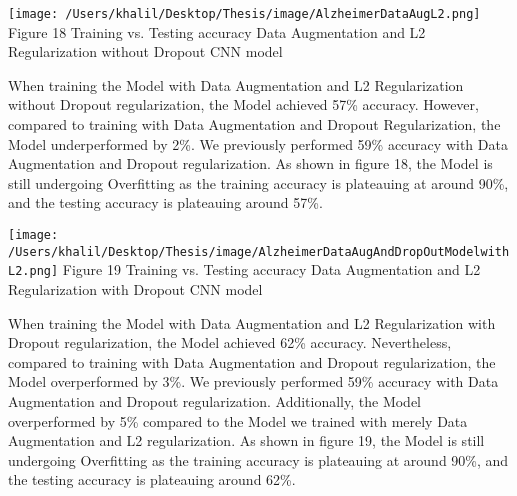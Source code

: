 \documentclass[oneside,12pt,article]{article}
\begin{document}
 \begin{center}
\texttt{[image: /Users/khalil/Desktop/Thesis/image/AlzheimerDataAugL2.png]} 
\newline
Figure 18 Training vs. Testing accuracy Data Augmentation and L2 Regularization without Dropout CNN model 
\end{center}
When training the Model with Data Augmentation and L2 Regularization without Dropout regularization, the Model achieved 57\% accuracy. However, compared to training with Data Augmentation and Dropout Regularization, the Model underperformed by 2\%. We previously performed 59\% accuracy with Data Augmentation and Dropout regularization. As shown in figure 18, the Model is still undergoing Overfitting as the training accuracy is plateauing at around 90\%, and the testing accuracy is plateauing around 57\%.


 \begin{center}
\texttt{[image: /Users/khalil/Desktop/Thesis/image/AlzheimerDataAugAndDropOutModelwithL2.png]} 
\newline
Figure 19 Training vs. Testing accuracy Data Augmentation and L2 Regularization with Dropout CNN model 
\end{center}
When training the Model with Data Augmentation and L2 Regularization with Dropout regularization, the Model achieved 62\% accuracy. Nevertheless, compared to training with Data Augmentation and Dropout regularization, the Model overperformed by 3\%. We previously performed 59\% accuracy with Data Augmentation and Dropout regularization. Additionally, the Model overperformed by 5\% compared to the Model we trained with merely Data Augmentation and L2 regularization. As shown in figure 19, the Model is still undergoing Overfitting as the training accuracy is plateauing at around 90\%, and the testing accuracy is plateauing around 62\%.
\end{document}
